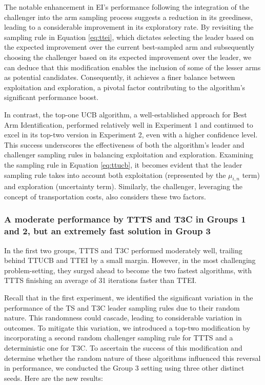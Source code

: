 \documentclass[a4paper, 12pt]{article}
\theoremstyle{definition}
\begin{document}
The notable enhancement in EI's performance following the integration of the challenger into the arm sampling process suggests a reduction in its greediness, leading to a considerable improvement in its exploratory rate. By revisiting the sampling rule in Equation \ref{eq:ttei}, which dictates selecting the leader based on the expected improvement over the current best-sampled arm and subsequently choosing the challenger based on its expected improvement over the leader, we can deduce that this modification enables the inclusion of some of the lesser arms as potential candidates. Consequently, it achieves a finer balance between exploitation and exploration, a pivotal factor contributing to the algorithm's significant performance boost.

In contrast, the top-one UCB algorithm, a well-established approach for Best Arm Identification, performed relatively well in Experiment 1 and continued to excel in its top-two version in Experiment 2, even with a higher confidence level. This success underscores the effectiveness of both the algorithm's leader and challenger sampling rules in balancing exploitation and exploration. Examining the sampling rule in Equation \ref{eq:ttucb}, it becomes evident that the leader sampling rule takes into account both exploitation (represented by the $\mu_{i,n}$ term) and exploration (uncertainty term). Similarly, the challenger, leveraging the concept of transportation costs, also considers these two factors.

\subsubsection{A moderate performance by TTTS and T3C in Groups 1 and 2, but an extremely fast solution in Group 3}
In the first two groups, TTTS and T3C performed moderately well, trailing behind TTUCB and TTEI by a small margin. However, in the most challenging problem-setting, they surged ahead to become the two fastest algorithms, with TTTS finishing an average of 31 iterations faster than TTEI.

Recall that in the first experiment, we identified the significant variation in the performance of the TS and T3C leader sampling rules due to their random nature. This randomness could cascade, leading to considerable variation in outcomes. To mitigate this variation, we introduced a top-two modification by incorporating a second random challenger sampling rule for TTTS and a deterministic one for T3C. To ascertain the success of this modification and determine whether the random nature of these algorithms influenced this reversal in performance, we conducted the Group 3 setting using three other distinct seeds. Here are the new results:
\end{document}
